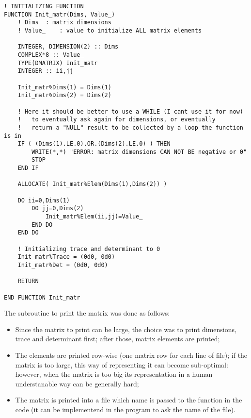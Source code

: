 \documentclass[12pt, a4paper, notitlepage]{report}
\begin{document}
\begin{lstlisting}
! INITIALIZING FUNCTION
FUNCTION Init_matr(Dims, Value_)
	! Dims	: matrix dimensions
	! Value_	: value to initialize ALL matrix elements
	
	INTEGER, DIMENSION(2) :: Dims
	COMPLEX*8 :: Value_
	TYPE(DMATRIX) Init_matr
	INTEGER :: ii,jj
	
	Init_matr%Dims(1) = Dims(1)
	Init_matr%Dims(2) = Dims(2)
	
	! Here it should be better to use a WHILE (I cant use it for now)
	! 	to eventually ask again for dimensions, or eventually
	!	return a "NULL" result to be collected by a loop the function is in
	IF ( (Dims(1).LE.0).OR.(Dims(2).LE.0) ) THEN
		WRITE(*,*) "ERROR: matrix dimensions CAN NOT BE negative or 0"
		STOP
	END IF
	
	ALLOCATE( Init_matr%Elem(Dims(1),Dims(2)) )
	
	DO ii=0,Dims(1)
		DO jj=0,Dims(2)
			Init_matr%Elem(ii,jj)=Value_
		END DO
	END DO
	
	! Initializing trace and determinant to 0
	Init_matr%Trace = (0d0, 0d0)
	Init_matr%Det = (0d0, 0d0)
	
	RETURN

END FUNCTION Init_matr
\end{lstlisting}

\vspace{0.7cm}

The subroutine to print the matrix was done as follows:
\begin{itemize}
	\item Since the matrix to print can be large, the choice was to print dimensions, trace and determinant first; after those, matrix elements are printed;
	\item The elements are printed row-wise (one matrix row for each line of file); if the matrix is too large, this way of representing it can become sub-optimal: however, when the matrix is too big its representation in a human understanable way can be generally hard;
	\item The matrix is printed into a file which name is passed to the function in the code (it can be implementend in the program to ask the name of the file).
\end{itemize}
\end{document}
